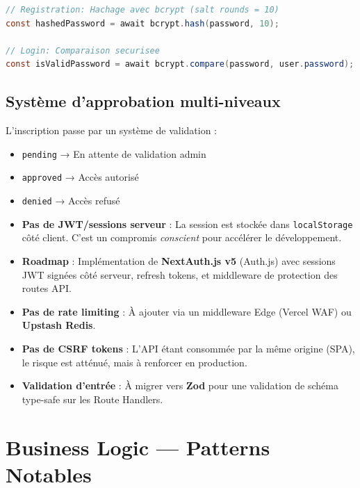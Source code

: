\documentclass[12pt, a4paper]{article}
\begin{document}
\begin{lstlisting}[language=Java, caption=Sécurité des mots de passe]
// Registration: Hachage avec bcrypt (salt rounds = 10)
const hashedPassword = await bcrypt.hash(password, 10);

// Login: Comparaison securisee
const isValidPassword = await bcrypt.compare(password, user.password);
\end{lstlisting}

\subsection{Système d'approbation multi-niveaux}

L'inscription passe par un système de validation :

\begin{itemize}[leftmargin=2em]
  \item \texttt{pending} → En attente de validation admin
  \item \texttt{approved} → Accès autorisé
  \item \texttt{denied} → Accès refusé
\end{itemize}

\begin{warnbox}
\begin{itemize}
  \item \textbf{Pas de JWT/sessions serveur} : La session est stockée dans \texttt{localStorage} côté client. C'est un compromis \textit{conscient} pour accélérer le développement.
  \item \textbf{Roadmap} : Implémentation de \textbf{NextAuth.js v5} (Auth.js) avec sessions JWT signées côté serveur, refresh tokens, et middleware de protection des routes API.
  \item \textbf{Pas de rate limiting} : À ajouter via un middleware Edge (Vercel WAF) ou \textbf{Upstash Redis}.
  \item \textbf{Pas de CSRF tokens} : L'API étant consommée par la même origine (SPA), le risque est atténué, mais à renforcer en production.
  \item \textbf{Validation d'entrée} : À migrer vers \textbf{Zod} pour une validation de schéma type-safe sur les Route Handlers.
\end{itemize}
\end{warnbox}

\section{Business Logic — Patterns Notables}
\end{document}

